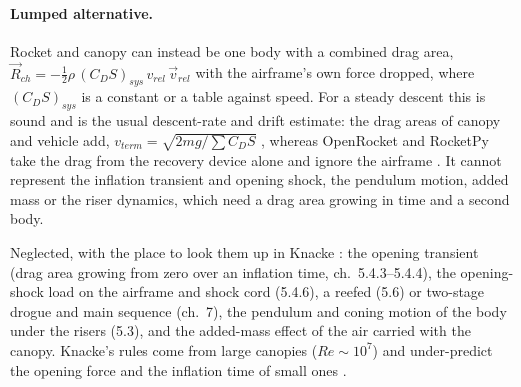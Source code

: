 \paragraph{Lumped alternative.} Rocket and canopy can instead be one body with a combined drag
area, $\vec{R}_{ch}=-\tfrac12\rho\,(C_DS)_{sys}\,v_{rel}\,\vec{v}_{rel}$ with the airframe's own
force dropped, where $(C_DS)_{sys}$ is a constant or a table against speed. For a steady descent
this is sound and is the usual descent-rate and drift estimate: the drag areas of canopy and
vehicle add, $v_{term}=\sqrt{2mg/\sum C_DS}$ \cite{whitmore}, whereas OpenRocket and RocketPy take
the drag from the recovery device alone and ignore the airframe \cite{ortech,hprrec}. It cannot
represent the inflation transient and opening shock, the pendulum motion, added mass or the riser
dynamics, which need a drag area growing in time and a second body.

Neglected, with the place to look them up in Knacke \cite{knacke}: the opening transient (drag area
growing from zero over an inflation time, ch.\ 5.4.3--5.4.4), the opening-shock load on the airframe
and shock cord (5.4.6), a reefed (5.6) or two-stage drogue and main sequence (ch.\ 7), the pendulum
and coning motion of the body under the risers (5.3), and the added-mass effect of the air carried
with the canopy. Knacke's rules come from large canopies ($Re\sim10^7$) and under-predict the
opening force and the inflation time of small ones \cite{jatm}.

